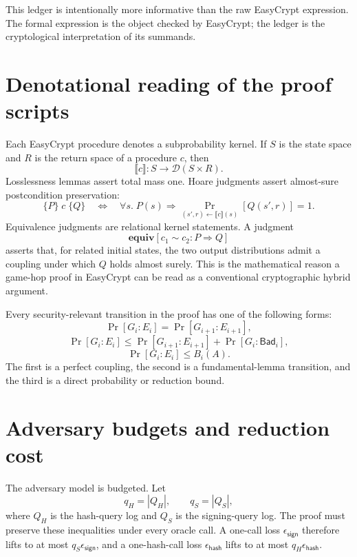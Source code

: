 This ledger is intentionally more informative than the raw EasyCrypt expression.
The formal expression is the object checked by EasyCrypt; the ledger is the
cryptological interpretation of its summands.

\section{Denotational reading of the proof scripts}
\label{sec:synthesis-denotational-rewritten}

Each EasyCrypt procedure denotes a subprobability kernel.  If \(S\) is the state
space and \(R\) is the return space of a procedure \(c\), then
\[
  \llbracket c\rrbracket:S\to\mathcal{D}(S\times R).
\]
Losslessness lemmas assert total mass one.  Hoare judgments assert almost-sure
postcondition preservation:
\[
  \{P\}\;c\;\{Q\}
  \quad\Longleftrightarrow\quad
  \forall s.\;P(s)\Rightarrow
  \Pr_{(s',r)\leftarrow\llbracket c\rrbracket(s)}[Q(s',r)]=1.
\]
Equivalence judgments are relational kernel statements.  A judgment
\[
  \mathbf{equiv}[c_1\sim c_2:P\Rightarrow Q]
\]
asserts that, for related initial states, the two output distributions admit a
coupling under which \(Q\) holds almost surely.  This is the mathematical reason
a game-hop proof in EasyCrypt can be read as a conventional cryptographic hybrid
argument.

\begin{proposition}
\label{prop:checked-game-transition-forms}
Every security-relevant transition in the proof has one of the following forms:
\[
  \Pr[G_i:E_i]=\Pr[G_{i+1}:E_{i+1}],
\]
\[
  \Pr[G_i:E_i]\le \Pr[G_{i+1}:E_{i+1}]+\Pr[G_i:\mathsf{Bad}_i],
\]
\[
  \Pr[G_i:E_i]\le B_i(A).
\]
The first is a perfect coupling, the second is a fundamental-lemma transition,
and the third is a direct probability or reduction bound.
\end{proposition}

\section{Adversary budgets and reduction cost}
\label{sec:synthesis-reduction-cost}

The adversary model is budgeted.  Let
\[
  q_H=|Q_H|,
  \qquad
  q_S=|Q_S|,
\]
where \(Q_H\) is the hash-query log and \(Q_S\) is the signing-query log.  The
proof must preserve these inequalities under every oracle call.  A one-call loss
\(\epsilon_{\mathsf{sign}}\) therefore lifts to at most
\(q_S\epsilon_{\mathsf{sign}}\), and a one-hash-call loss
\(\epsilon_{\mathsf{hash}}\) lifts to at most
\(q_H\epsilon_{\mathsf{hash}}\).

